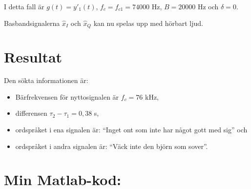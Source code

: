 \documentclass[10pt,twocolumn]{article}
\begin{document}
I detta fall är $g(t)=y'_1(t)$, $f_c = f_{c1} = 74000$ Hz, $B=20000$ Hz och $\delta = 0$.

Basbandsignalerna $\hat{x}_I$ och $\hat{x}_Q$ kan nu spelas upp med hörbart ljud.

\section{Resultat}

Den sökta informationen är:
\begin{itemize}
\item Bärfrekvensen för nyttosignalen är $f_c=76$ kHz,
\item differensen $\tau_2 - \tau_1 = 0,38$ s, 
\item ordspråket i ena signalen är: ``Inget ont som inte har något gott med sig'' och
\item ordspråket i andra signalen är: ``Väck inte den björn som sover''.
\end{itemize}

\onecolumn
\clearpage

\section*{Min Matlab-kod:}
\end{document}
